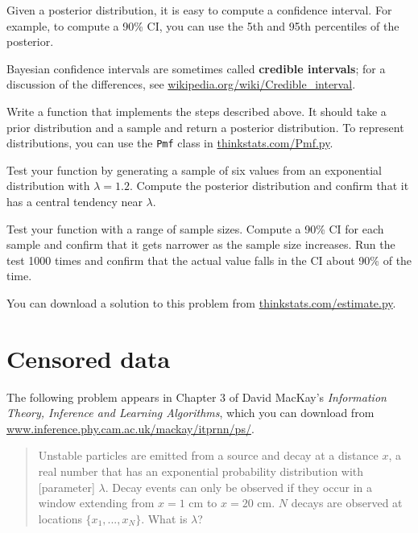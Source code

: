 \documentclass[12pt]{book}
\begin{document}
Given a posterior distribution, it is easy to compute a confidence
interval.  For example, to compute a 90\% CI, you can
use the 5th and 95th percentiles of the posterior.

Bayesian confidence intervals are sometimes called {\bf credible
intervals}; for a discussion of the differences, see
\url{wikipedia.org/wiki/Credible_interval}.


\begin{ex}

Write a function that implements the steps described above.  It should
take a prior distribution and a sample and return a posterior distribution.
To represent distributions, you can use
the {\tt Pmf} class in \url{thinkstats.com/Pmf.py}.

Test your function by generating a sample of six values from an
exponential distribution with $\lambda = 1.2$.  Compute the posterior
distribution and confirm that it has a central tendency near $\lambda$.

Test your function with a range of sample sizes.  Compute a 90\% CI
for each sample and confirm that it gets narrower as
the sample size increases.  Run the test 1000 times and confirm that
the actual value falls in the CI about 90\% of the time.

You can download a solution to this problem from
\url{thinkstats.com/estimate.py}.

\end{ex}







\section{Censored data}
\label{censored}

The following problem appears in Chapter 3 of David MacKay's
{\em Information Theory, Inference and Learning
  Algorithms}, which you can download from
\url{www.inference.phy.cam.ac.uk/mackay/itprnn/ps/}.

\begin{quote}

Unstable particles are emitted from a source and decay at a distance
$x$, a real number that has an exponential probability distribution
with [parameter] $\lambda$.  Decay events can
only be observed if they occur in a window extending from $x=1$ cm to
$x=20$ cm.  $N$ decays are observed at locations $\{ x_1, ... , x_N
\}$.  What is $\lambda$?

\end{quote}
\end{document}
